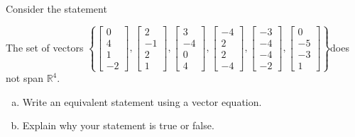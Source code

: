 
\begin{exerciseStatement}


Consider the statement 
\begin{center}\begin{minipage}{0.8\textwidth}
 The set of vectors \( \left\{ \left[\begin{array}{c}
0 \\
4 \\
1 \\
-2
\end{array}\right] , \left[\begin{array}{c}
2 \\
-1 \\
2 \\
1
\end{array}\right] , \left[\begin{array}{c}
3 \\
-4 \\
0 \\
4
\end{array}\right] , \left[\begin{array}{c}
-4 \\
2 \\
2 \\
-4
\end{array}\right] , \left[\begin{array}{c}
-3 \\
-4 \\
-4 \\
-2
\end{array}\right] , \left[\begin{array}{c}
0 \\
-5 \\
-3 \\
1
\end{array}\right] \right\} \)does not span \(\mathbb{R}^4\). 
\end{minipage}\end{center}
    


\begin{enumerate}[(a)]
\item  Write an equivalent statement using a vector equation.
\item  Explain why your statement is true or false.
\end{enumerate}
    
\end{exerciseStatement}
    
